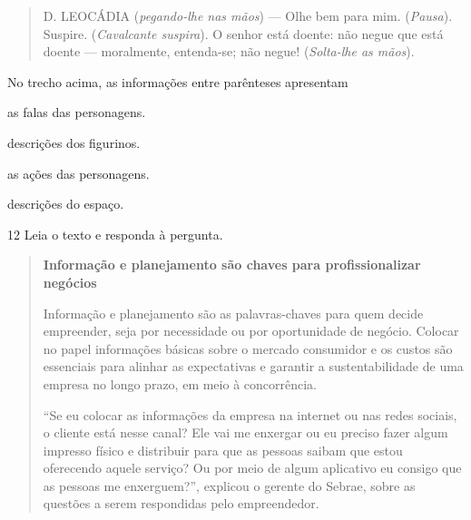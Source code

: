 \begin{quote}
D. LEOCÁDIA (\textit{pegando-lhe nas mãos}) --- Olhe bem para mim. 
(\textit{Pausa}). Suspire. (\textit{Cavalcante suspira}). O senhor está
doente: não negue que está doente --- moralmente, entenda-se; não negue!
(\textit{Solta-lhe as mãos}).

\end{quote}

No trecho acima, as informações entre parênteses apresentam

\begin{escolha}
  \item as falas das personagens.

  \item descrições dos figurinos.

  \item as ações das personagens.

  \item descrições do espaço.
\end{escolha}



\num{12} Leia o texto e responda à pergunta.

\begin{quote}
\textbf{Informação e planejamento são chaves para profissionalizar negócios}

Informação e planejamento são as palavras-chaves para quem decide
empreender, seja por necessidade ou por oportunidade de negócio. Colocar
no papel informações básicas sobre o mercado consumidor e os custos são
essenciais para alinhar as expectativas e garantir a sustentabilidade de
uma empresa no longo prazo, em meio à concorrência.

``Se eu colocar as informações da empresa na internet ou nas redes
sociais, o cliente está nesse canal? Ele vai me enxergar ou eu preciso
fazer algum impresso físico e distribuir para que as pessoas saibam que
estou oferecendo aquele serviço? Ou por meio de algum aplicativo eu
consigo que as pessoas me enxerguem?'', explicou o gerente do Sebrae,
sobre as questões a serem respondidas pelo empreendedor.

\end{quote}

